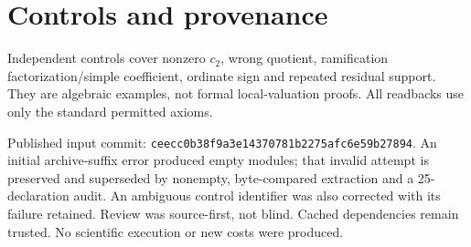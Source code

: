 \documentclass[10pt]{article}\usepackage[margin=0.8in]{geometry}\usepackage[T1]{fontenc}\usepackage{lmodern,amsmath,hyperref}
\begin{document}
\section*{Controls and provenance}
Independent controls cover nonzero $c_2$, wrong quotient, ramification factorization/simple coefficient, ordinate sign and repeated residual support. They are algebraic examples, not formal local-valuation proofs. All readbacks use only the standard permitted axioms.

Published input commit: \texttt{ceecc0b38f9a3e14370781b2275afc6e59b27894}. An initial archive-suffix error produced empty modules; that invalid attempt is preserved and superseded by nonempty, byte-compared extraction and a 25-declaration audit. An ambiguous control identifier was also corrected with its failure retained. Review was source-first, not blind. Cached dependencies remain trusted. No scientific execution or new costs were produced.
\end{document}
